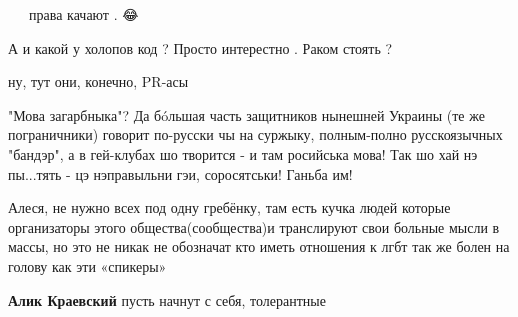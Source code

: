 \begin{itemize}
🐓 🐓🐓 права качают . 😂

 
А и какой у холопов код ? Просто интерестно . Раком стоять ?

 
ну, тут они, конечно, PR-асы

 

"Мова загарбныка"? Да бóльшая часть защитников нынешней Украины (те же
пограничники) говорит по-русски чы на суржыку, полным-полно русскоязычных
"бандэр", а в гей-клубах шо творится - и там росийська мова! Так шо хай нэ
пы...тять - цэ нэправыльни гэи, соросятськи! Ганьба им!


 

Алеся, не нужно всех под одну гребёнку, там есть кучка людей которые
организаторы этого общества(сообщества)и транслируют свои больные мысли в
массы, но это не никак не обозначат кто иметь отношения к лгбт так же болен на
голову как эти «спикеры»

\begin{itemize}
 
\textbf{Алик Краевский} пусть начнут с себя, толерантные

 

\end{itemize}
\end{itemize}
